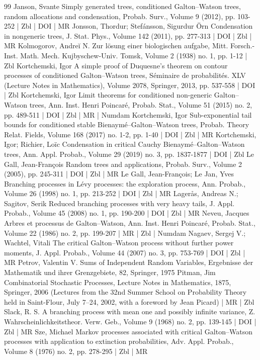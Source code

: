 \documentclass[10pt]{amsart}
\theoremstyle{definition}\newtheorem{defi}[theo]{Definition}\newtheorem{rema}[theo]{Remark}\newtheorem{exam}[theo]{Example}\newtheorem{exem}[theo]{Example}\newtheorem{nota}[theo]{Notation}
\begin{document}
\begin{thebibliography}{99}
Janson, Svante Simply generated trees, conditioned Galton–Watson trees, random allocations and condensation, Probab. Surv., Volume 9 (2012), pp. 103-252 | Zbl | DOI | MR
Jonsson, Thordur; Stefánsson, Sigurdur Örn Condensation in nongeneric trees, J. Stat. Phys., Volume 142 (2011), pp. 277-313 | DOI | Zbl | MR
Kolmogorov, Andreĭ N. Zur lösung einer biologischen aufgabe, Mitt. Forsch.-Inst. Math. Mech. Kujbyschew-Univ. Tomsk, Volume 2 (1938) no. 1, pp. 1-12 | Zbl
Kortchemski, Igor A simple proof of Duquesne’s theorem on contour processes of conditioned Galton–Watson trees, Séminaire de probabilités. XLV (Lecture Notes in Mathematics), Volume 2078, Springer, 2013, pp. 537-558 | DOI | Zbl
Kortchemski, Igor Limit theorems for conditioned non-generic Galton–Watson trees, Ann. Inst. Henri Poincaré, Probab. Stat., Volume 51 (2015) no. 2, pp. 489-511 | DOI | Zbl | MR | Numdam
Kortchemski, Igor Sub-exponential tail bounds for conditioned stable Bienaymé–Galton–Watson trees, Probab. Theory Relat. Fields, Volume 168 (2017) no. 1-2, pp. 1-40 | DOI | Zbl | MR
Kortchemski, Igor; Richier, Loïc Condensation in critical Cauchy Bienaymé–Galton–Watson trees, Ann. Appl. Probab., Volume 29 (2019) no. 3, pp. 1837-1877 | DOI | Zbl
Le Gall, Jean-François Random trees and applications, Probab. Surv., Volume 2 (2005), pp. 245-311 | DOI | Zbl | MR
Le Gall, Jean-François; Le Jan, Yves Branching processes in Lévy processes: the exploration process, Ann. Probab., Volume 26 (1998) no. 1, pp. 213-252 | DOI | Zbl | MR
Lagerås, Andreas N.; Sagitov, Serik Reduced branching processes with very heavy tails, J. Appl. Probab., Volume 45 (2008) no. 1, pp. 190-200 | DOI | Zbl | MR
Neveu, Jacques Arbres et processus de Galton–Watson, Ann. Inst. Henri Poincaré, Probab. Stat., Volume 22 (1986) no. 2, pp. 199-207 | MR | Zbl | Numdam
Nagaev, Sergej V.; Wachtel, Vitali The critical Galton–Watson process without further power moments, J. Appl. Probab., Volume 44 (2007) no. 3, pp. 753-769 | DOI | Zbl | MR
Petrov, Valentin V. Sums of Independent Random Variables, Ergebnisse der Mathematik und ihrer Grenzgebiete, 82, Springer, 1975
Pitman, Jim Combinatorial Stochastic Processes, Lecture Notes in Mathematics, 1875, Springer, 2006 (Lectures from the 32nd Summer School on Probability Theory held in Saint-Flour, July 7–24, 2002, with a foreword by Jean Picard) | MR | Zbl
Slack, R. S. A branching process with mean one and possibly infinite variance, Z. Wahrscheinlichkeitstheor. Verw. Geb., Volume 9 (1968) no. 2, pp. 139-145 | DOI | Zbl | MR
Sze, Michael Markov processes associated with critical Galton–Watson processes with application to extinction probabilities, Adv. Appl. Probab., Volume 8 (1976) no. 2, pp. 278-295 | Zbl | MR
\end{thebibliography}
\end{document}
